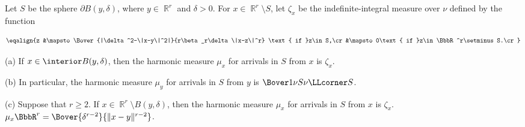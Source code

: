  Let $S$ be the sphere $\partial B(y,\delta)$,
where $y\in\BbbR^r$ and $\delta>0$.   For $x\in\BbbR^r\setminus S$, let
$\zeta_x$ be the indefinite-integral measure over $\nu$ defined by the
function

$$\eqalign{z
&\mapsto\Bover{|\delta^2-\|x-y\|^2|}{r\beta_r\delta\|x-z\|^r}
  \text{ if }z\in S,\cr
&\mapsto 0\text{ if }z\in\BbbR^r\setminus S.\cr}$$

(a) If $x\in\interior B(y,\delta)$,
then the harmonic measure $\mu_x$ for arrivals in $S$ from $x$
is $\zeta_x$.

(b) In particular, the harmonic measure $\mu_y$ for arrivals in $S$ from
$y$ is $\Bover1{\nu S}\nu\LLcorner S$.

(c) Suppose that $r\ge 2$.   If $x\in\BbbR^r\setminus B(y,\delta)$,
then the harmonic measure $\mu_x$ for arrivals in $S$ from
$x$ is $\zeta_x$.
$\mu_x\BbbR^r=\Bover{\delta^{r-2}}{\|x-y\|^{r-2}}$.

